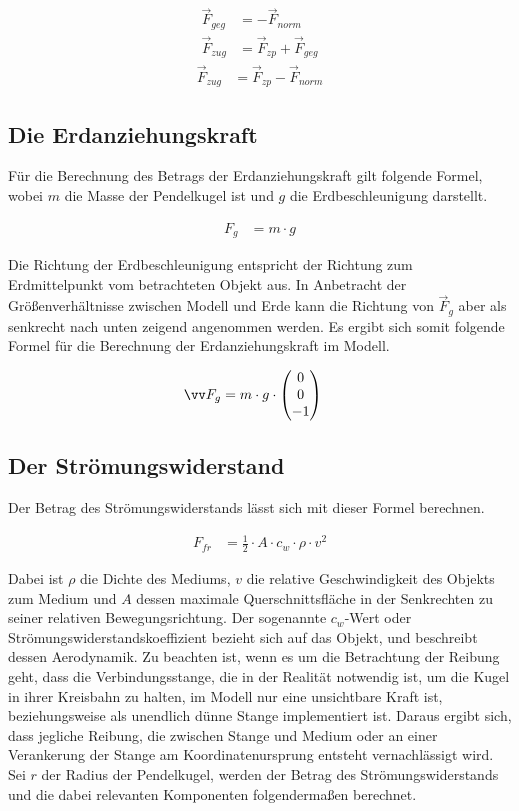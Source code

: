 \begin{align*}
    \vec{F}_{geg} &= - \vec{F}_{norm}\\
    \vec{F}_{zug} &= \vec{F}_{zp} + \vec{F}_{geg}
\end{align*}
\begin{align} \label{f_zug}
    \vec{F}_{zug} &= \vec{F}_{zp} - \vec{F}_{norm}
\end{align}

\subsection{Die Erdanziehungskraft}
\label{ssec:die_erdanziehungskraft}

Für die Berechnung des Betrags der Erdanziehungskraft gilt folgende Formel, wobei $m$ die Masse der Pendelkugel ist und $g$ die Erdbeschleunigung darstellt.

\begin{align*}
    F_{g} &= m \cdot g
\end{align*}

Die Richtung der Erdbeschleunigung entspricht der Richtung zum Erdmittelpunkt vom betrachteten Objekt aus. In Anbetracht der Größenverhältnisse zwischen Modell und Erde kann die Richtung von $\vec{F}_{g}$ aber als senkrecht nach unten zeigend angenommen werden. Es ergibt sich somit folgende Formel für die Berechnung der Erdanziehungskraft im Modell.

\begin{align} \label{f_g}
    \vec{F}_{g} &= m \cdot g \cdot \cvec{0}{0}{-1}
\end{align}

\subsection{Der Strömungswiderstand}
\label{ssec:der_strömungswiderstand}

Der Betrag des Strömungswiderstands lässt sich mit dieser Formel berechnen.

\begin{align*}
    F_{fr} &= \frac{1}{2} \cdot A \cdot c_{w} \cdot \rho \cdot v^2
\end{align*}

Dabei ist $\rho$ die Dichte des Mediums, $v$ die relative Geschwindigkeit des Objekts zum Medium und $A$ dessen maximale Querschnittsfläche in der Senkrechten zu seiner relativen Bewegungsrichtung. Der sogenannte $c_{w}$-Wert oder Strömungswiderstandskoeffizient bezieht sich auf das Objekt, und beschreibt dessen Aerodynamik. Zu beachten ist, wenn es um die Betrachtung der Reibung geht, dass die Verbindungsstange, die in der Realität notwendig ist, um die Kugel in ihrer Kreisbahn zu halten, im Modell nur eine unsichtbare Kraft ist, beziehungsweise als unendlich dünne Stange implementiert ist. Daraus ergibt sich, dass jegliche Reibung, die zwischen Stange und Medium oder an einer Verankerung der Stange am Koordinatenursprung entsteht vernachlässigt wird. Sei $r$ der Radius der Pendelkugel, werden der Betrag des Strömungswiderstands und die dabei relevanten Komponenten folgendermaßen berechnet.

